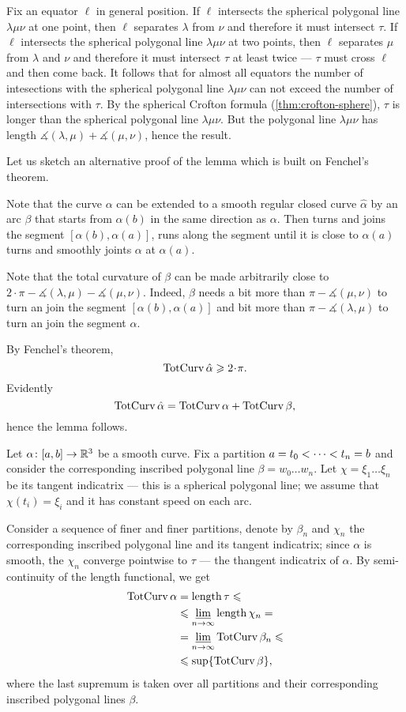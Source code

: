 Fix an equator $\ell$ in general position.
If $\ell$ intersects the spherical polygonal line $\lambda \mu \nu$ at one point, then $\ell$ separates $\lambda$ from $\nu$ and therefore it must intersect $\tau$.
If $\ell$ intersects the spherical polygonal line $\lambda \mu \nu$ at two points, then $\ell$ separates $\mu$ from $\lambda$ and $\nu$ and therefore it must intersect $\tau$ at least twice --- $\tau$ must cross $\ell$ and then come back.
It follows that for almost all equators the number of intesections with the spherical polygonal line $\lambda \mu\nu$ can not exceed the number of intersections with $\tau$.
By the spherical Crofton formula (\ref{thm:crofton-sphere}), $\tau$ is longer than the spherical polygonal line $\lambda \mu\nu$.
But the polygonal line $\lambda \mu\nu$ has length $\measuredangle (\lambda,\mu)+\measuredangle (\mu,\nu)$, hence the result.
\qeds

Let us sketch an alternative proof of the lemma which is built on Fenchel's theorem. 

Note that the curve $\alpha$ can be extended to a smooth regular closed curve $\hat\alpha$ by an arc $\beta$ that starts from $\alpha(b)$ in the same direction as $\alpha$. Then turns and joins the segment $[\alpha(b),\alpha(a)]$, runs along the segment until it is close to $\alpha(a)$ turns and smoothly joints $\alpha$ at $\alpha(a)$.

Note that the total curvature of $\beta$ can be made arbitrarily close to $2\cdot\pi -\measuredangle (\lambda,\mu)-\measuredangle (\mu,\nu)$.
Indeed, $\beta$ needs a bit more than $\pi -\measuredangle (\mu,\nu)$ to turn an join the segment $[\alpha(b),\alpha(a)]$ and bit more than $\pi -\measuredangle (\lambda,\mu)$ to turn an join the segment $\alpha$.

By Fenchel's theorem,
\[\tc\hat\alpha\ge 2\cdot \pi.\]
Evidently 
\[\mathop{\rm TotCurv}\nolimits\hat\alpha=\mathop{\rm TotCurv}\nolimits\alpha+\mathop{\rm TotCurv}\nolimits\beta,\]
hence the lemma follows.
\qeds


Let $\alpha\colon[a,b]\to\mathbb{R}^3$ be a smooth curve.
Fix a partition $a\z=t_0<\dots<t_n=b$ and consider the corresponding inscribed polygonal line $\beta=w_0\dots w_n$.
Let $\chi=\xi_1\dots\xi_n$ be its tangent indicatrix --- this is a spherical polygonal line;
we assume that $\chi(t_i)=\xi_i$ and it has constant speed on each arc.

Consider a sequence of finer and finer partitions, denote by $\beta_n$ and $\chi_n$ the corresponding inscribed polygonal line and its tangent indicatrix;
since $\alpha$ is smooth, the $\chi_n$ converge pointwise to $\tau$ --- the thangent indicatrix of $\alpha$.
By semi-continuity of the length functional, we get  
\begin{align*}
\mathop{\rm TotCurv}\nolimits\alpha&=\mathop{\rm length}\nolimits \tau\leqslant  
\\
&\leqslant \varliminf_{n\to\infty}\mathop{\rm length}\nolimits \chi_n=
\\
&= \varliminf_{n\to\infty}\mathop{\rm TotCurv}\nolimits \beta_n\leqslant
\\
&\leqslant \sup\{\mathop{\rm TotCurv}\nolimits\beta\},
\end{align*}
where the last supremum is taken over all partitions and their corresponding inscribed polygonal lines $\beta$.

